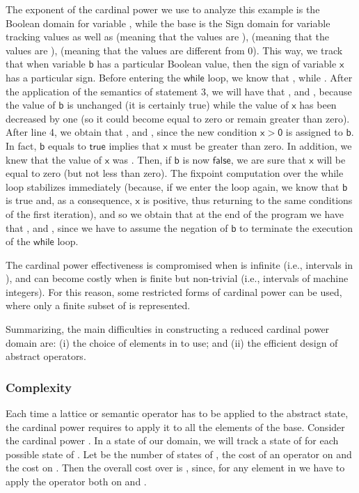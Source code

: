 \documentclass[submission,copyright,creativecommons]{eptcs}
\newcommand{\statement}[1]{\ensuremath{\mathsf{#1}}}
\begin{document}
The exponent of the cardinal power we use to analyze this example is the Boolean domain for variable , while the base is the Sign domain for variable  tracking values  as well as  (meaning that the values are ),  (meaning that the values are ),  (meaning that the values are different from 0). This way, we track that when variable \statement{b} has a particular Boolean value, then the sign of variable \statement{x} has a particular sign. Before entering the \statement{while} loop, we know that , while . After the application of the semantics of statement 3, we will have that , and , because the value of \statement{b} is unchanged (it is certainly true) while the value of \statement{x} has been decreased by one (so it could become equal to zero or remain greater than zero). After line 4, we obtain that , and , since the new condition \statement{x>0} is assigned to \statement{b}. In fact, \statement{b} equals to \statement{true} implies that \statement{x} must be greater than zero. In addition, we knew that the value of \statement{x} was . Then, if \statement{b} is now \statement{false}, we are sure that \statement{x} will be equal to zero (but not less than zero). The fixpoint computation over the while loop stabilizes immediately (because, if we enter the loop again, we know that \statement{b} is true and, as a consequence, \statement{x} is positive, thus returning to the same conditions of the first iteration), and so we obtain that at the end of the program we have that , and , since we have to assume the negation of \statement{b} to terminate the execution of the \statement{while} loop. 





The cardinal power effectiveness is compromised when  is infinite (i.e., intervals in ), and can become costly when  is finite but non-trivial (i.e., intervals of machine integers). For this reason, some restricted forms of cardinal power can be used, where only a finite subset of  is represented.

Summarizing, the main difficulties in constructing a reduced cardinal power domain are: (i) the choice of elements in  to use; and (ii) the efficient design of abstract operators.

\subsubsection{Complexity}
Each time a lattice or semantic operator has to be applied to the abstract state, the cardinal power requires to apply it to all the elements of the base. Consider the cardinal power . In a state of our domain, we will track a state of  for each possible state of . Let  be the number of states of ,  the cost of an operator on  and  the cost on . Then the overall cost over  is , since, for any element in  we have to apply the operator both on  and .
\end{document}
